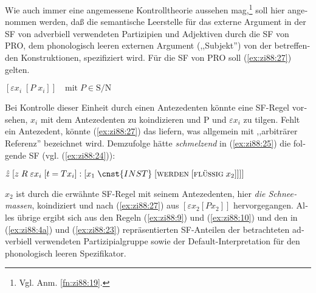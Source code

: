 \documentclass[output=paper,colorlinks,citecolor=brown, booklanguage=german]{langscibook}
\begin{document}
\begin{otherlanguage}{german}
\noindent Wie auch immer eine angemessene Kontrolltheorie aussehen mag,\footnote{Vgl. Anm. \ref{fn:zi88:19}.} soll hier angenommen werden, daß die semantische Leerstelle für das externe Argument in der SF von adverbiell verwendeten Partizipien und Adjektiven durch die SF von PRO, dem phonologisch leeren externen Argument (,,Subjekt'') von der be\-tref\-fen\-den Konstruktionen, spezifiziert wird. Für die SF von PRO soll (\ref{ex:zi88:27}) gelten.

\ea\label{ex:zi88:27} $[\varepsilon x_i \; [P \; x_i]] \quad \textrm{mit} \; P \in \textrm{S/N}$
\z 

\noindent Bei Kontrolle dieser Einheit durch einen Antezedenten könnte eine SF-Regel vorsehen, $x_i$ mit dem Antezedenten zu koindizieren und P und $\varepsilon x_i$ zu tilgen. Fehlt ein Antezedent, könnte (\ref{ex:zi88:27}) das liefern, was allgemein mit ,,arbiträrer Referenz'' bezeichnet wird. Demzufolge hätte \textit{schmelzend} in (\ref{ex:zi88:25}) die folgende SF (vgl. (\ref{ex:zi88:24})):

\ea\label{ex:zi88:28} $\hat{z} \; [z \; R \; \varepsilon x_i \; [t = Tx_i] : [x_1 \; \cnst{INST} \; [\textsc{werden} \; [\textsc{flüssig} \; x_2]]]]$
\z 

\noindent $x_2$ ist durch die erwähnte SF-Regel mit seinem Antezedenten, hier \textit{die Schneemassen}, koindiziert und nach (\ref{ex:zi88:27}) aus $[\varepsilon x_2 [P x_2]]$ hervorgegangen. Alles übrige ergibt sich aus den Regeln (\ref{ex:zi88:9}) und (\ref{ex:zi88:10}) und den in (\ref{ex:zi88:4a}) und (\ref{ex:zi88:23}) repräsentierten SF-Anteilen der betrachteten adverbiell verwendeten Partizipialgruppe sowie der Default-Interpretation für den phonologisch leeren Spezifikator.


\end{otherlanguage}
\end{document}

